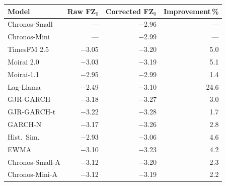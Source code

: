 \begin{tabular}{@{}lrrr@{}}
\toprule
Model & Raw FZ$_0$ & Corrected FZ$_0$ & Improvement\,\% \\
\midrule
Chronos-Small & --- & $-$2.96 & --- \\
Chronos-Mini & --- & $-$2.99 & --- \\
TimesFM 2.5 & $-$3.05 & $-$3.20 & 5.0 \\
Moirai 2.0 & $-$3.03 & $-$3.19 & 5.1 \\
Moirai-1.1 & $-$2.95 & $-$2.99 & 1.4 \\
\midrule
Lag-Llama & $-$2.49 & $-$3.10 & 24.6 \\
GJR-GARCH & $-$3.18 & $-$3.27 & 3.0 \\
GJR-GARCH-t & $-$3.22 & $-$3.28 & 1.7 \\
GARCH-N & $-$3.17 & $-$3.26 & 2.8 \\
Hist.\ Sim. & $-$2.93 & $-$3.06 & 4.6 \\
EWMA & $-$3.10 & $-$3.23 & 4.2 \\
Chronos-Small-A & $-$3.12 & $-$3.20 & 2.3 \\
Chronos-Mini-A & $-$3.12 & $-$3.19 & 2.2 \\
\bottomrule
\end{tabular}
